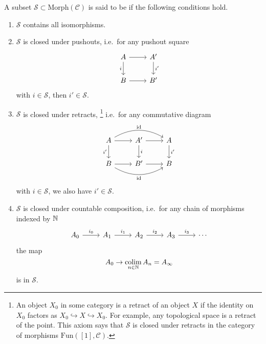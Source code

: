 \documentclass[main.tex]{subfiles}
\begin{document}
\begin{definition}[saturated]
  \label{def:saturated}
  A subset $\mathcal{S} \subset \mathrm{Morph}(\mathcal{C})$ is said to be  if the following conditions hold.
  \begin{enumerate}
    \item $\mathcal{S}$ contains all isomorphisms.

    \item $\mathcal{S}$ is closed under pushouts, i.e.\ for any pushout square
      \begin{equation*}
        \begin{tikzcd}
          A
          \arrow[r]
          \arrow[d, swap, "i"]
          & A'
          \arrow[d, "i'"]
          \\
          B
          \arrow[r]
          & B'
        \end{tikzcd}
      \end{equation*}
      with $i \in \mathcal{S}$, then $i' \in \mathcal{S}$.

    \item $\mathcal{S}$ is closed under retracts,
      \footnote{An object $X_{0}$ in some category is a retract of an object $X$ if the identity on $X_{0}$ factors as $X_{0} \hookrightarrow X \hookrightarrow X_{0}$. For example, any topological space is a retract of the point. This axiom says that $\mathcal{S}$ is closed under retracts in the category of morphisms $\mathrm{Fun}([1], \mathcal{C})$.}
      i.e.\ for any commutative diagram
      \begin{equation*}
        \begin{tikzcd}
          A
          \arrow[rr, bend left, "\id"]
          \arrow[r]
          \arrow[d, swap, "i'"]
          & A'
          \arrow[r]
          \arrow[d, "i"]
          & A
          \arrow[d, "i'"]
          \\
          B
          \arrow[rr, bend right, swap, "\id"]
          \arrow[r]
          & B'
          \arrow[r]
          & B
        \end{tikzcd}
      \end{equation*}
      with $i \in \mathcal{S}$, we also have $i' \in \mathcal{S}$.

    \item $\mathcal{S}$ is closed under countable composition, i.e.\ for any chain of morphisms indexed by $\mathbb{N}$
      \begin{equation*}
        \begin{tikzcd}
          A_{0}
          \arrow[r, "i_{0}"]
          & A_{1}
          \arrow[r, "i_{1}"]
          & A_{2}
          \arrow[r, "i_{2}"]
          & A_{3}
          \arrow[r, "i_{3}"]
          & \cdots
        \end{tikzcd}
      \end{equation*}
      the map
      \begin{equation*}
        A_{0} \to \operatorname*{colim}_{n \in \mathbb{N}} A_{n} = A_{\infty}
      \end{equation*}
      is in $\mathcal{S}$.


\end{enumerate}
\end{definition}
\end{document}
